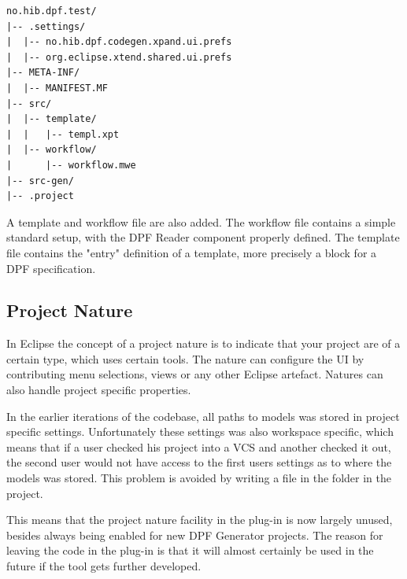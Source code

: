 \lstset{caption=Listing shows the generated project structure for a DPF Generator Project,label=list:projectstructure,captionpos=b}
\begin{table}[ht]
  \centering
\begin{lstlisting}[showstringspaces=false]
no.hib.dpf.test/
|-- .settings/
|  |-- no.hib.dpf.codegen.xpand.ui.prefs
|  |-- org.eclipse.xtend.shared.ui.prefs                                                                                                                                   
|-- META-INF/
|  |-- MANIFEST.MF
|-- src/
|  |-- template/
|  |   |-- templ.xpt
|  |-- workflow/
|      |-- workflow.mwe
|-- src-gen/
|-- .project
\end{lstlisting}
\end{table}

A template and workflow file are also added. The workflow file contains a simple standard setup, with the DPF Reader component properly defined. The template file contains the "entry" definition of a template, more precisely a  block for a DPF specification.

\subsection{Project Nature}
In Eclipse the concept of a project nature is to indicate that your project are of a certain type, which uses certain tools. The nature can configure the UI by contributing menu selections, views or any other Eclipse artefact. Natures can also handle project specific properties. 

In the earlier iterations of the codebase, all paths to models was stored in project specific settings. Unfortunately these settings was also workspace specific, which means that if a user checked his project into a VCS and another checked it out, the second user would not have access to the first users settings as to where the models was stored. This problem is avoided by writing a  file in the  folder in the project.

This means that the project nature facility in the plug-in is now largely unused, besides always being enabled for new DPF Generator projects. The reason for leaving the code in the plug-in is that it will almost certainly be used in the future if the tool gets further developed.

